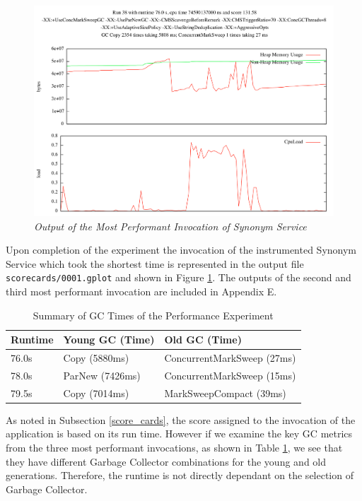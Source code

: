 \documentclass[]{final_report}
\begin{document}
\begin{figure}[!h]
\begin{center}
\includegraphics[scale=0.5]{figures/gplot_1.png}
\caption{\small \sl Output of the Most Performant Invocation of Synonym Service \label{fig0001}}
\end{center} 
\end{figure}

Upon completion of the experiment the invocation of the instrumented Synonym Service which took the shortest time is represented in the output file \lstinline{scorecards/0001.gplot} and shown in Figure \ref{fig0001}. The outputs of the second and third most performant invocation are included in Appendix E.

\begin{table}
\begin{center}
\begin{tabular}{lll}
Runtime & Young GC (Time) & Old GC (Time) \\ \hline
76.0s & Copy (5880ms) & ConcurrentMarkSweep (27ms) \\ \hline
78.0s & ParNew (7426ms) & ConcurrentMarkSweep (15ms) \\ \hline
79.5s & Copy (7014ms) & MarkSweepCompact (39ms) \\ \hline
\end{tabular}
\caption{Summary of GC Times of the Performance Experiment}
\label{table:summary_gc_times}
\end{center}
\end{table}

As noted in Subsection \ref{score_cards}, the score assigned to the invocation of the application is based on its run time. However if we examine the key GC metrics from the three most performant invocations, as shown in Table \ref{table:summary_gc_times}, we see that they have different Garbage Collector combinations for the young and old generations. Therefore, the runtime is not directly dependant on the selection of Garbage Collector.
\end{document}
